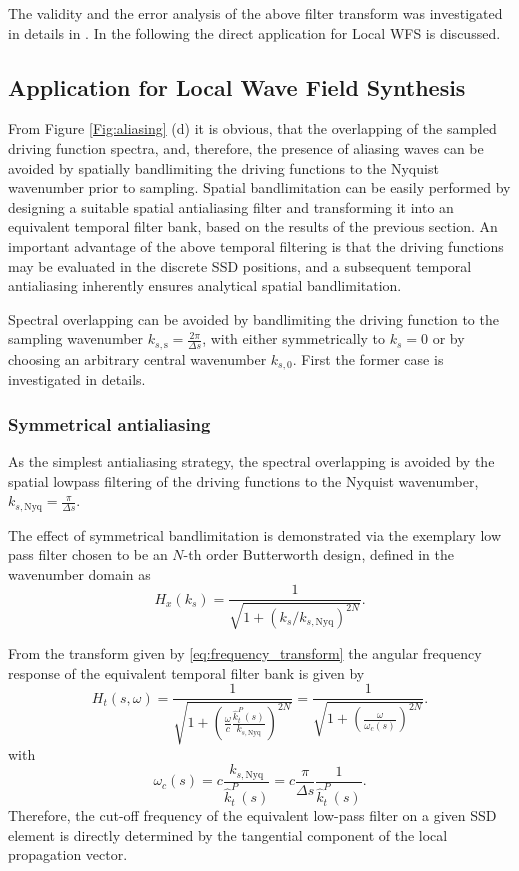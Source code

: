 \documentclass[conference]{IEEEtran}
\begin{document}
The validity and the error analysis of the above filter transform was investigated in details in \cite{Firtha DAGA2023}.
In the following the direct application for Local WFS is discussed.

\subsection{Application for Local Wave Field Synthesis}

From Figure \ref{Fig:aliasing} (d) it is obvious, that the overlapping of the sampled driving function spectra, and, therefore, the presence of aliasing waves can be avoided by spatially bandlimiting the driving functions to the Nyquist wavenumber prior to sampling.
Spatial bandlimitation can be easily performed by designing a suitable spatial antialiasing filter and transforming it into an equivalent temporal filter bank, based on the results of the previous section.
An important advantage of the above temporal filtering is that the driving functions may be evaluated in the discrete SSD positions, and a subsequent temporal antialiasing inherently ensures analytical spatial bandlimitation.

Spectral overlapping can be avoided by bandlimiting the driving function to the sampling wavenumber $k_{s,\mathrm{s}} = \frac{2\pi}{\Delta s}$, with either symmetrically to $k_s = 0$ or by choosing an arbitrary central wavenumber $k_{s,0}$.
First the former case is investigated in details.

\subsubsection{Symmetrical antialiasing}
As the simplest antialiasing strategy, the spectral overlapping is avoided by the spatial lowpass filtering of the driving functions to the Nyquist wavenumber, $k_{s,\mathrm{Nyq}} = \frac{\pi}{\Delta s}$.

The effect of symmetrical bandlimitation is demonstrated via the exemplary low pass filter chosen to be an $N$-th order Butterworth design, defined in the wavenumber domain as
\begin{equation}
    H_x(k_s) = \frac{ 1 }{ \sqrt{ 1 + \left( k_s / k_{s,\mathrm{Nyq}} \right)^{2N} } }.
\end{equation}

From the transform given by \eqref{eq:frequency_transform} the angular frequency response of the equivalent temporal filter bank is given by
\begin{equation}
    H_t(s,\omega) = \frac{ 1 }{ \sqrt{ 1 + \left( \frac{\omega}{c}\frac{\hat{k}_t^P(s)}{k_{s,\mathrm{Nyq}}}  \right)^{2N} } } =  \frac{ 1 }{ \sqrt{ 1 + \left( \frac{\omega}{\omega_c(s)}  \right)^{2N} } } .
\end{equation}
with
\begin{equation}
    \omega_c(s) = c \frac{k_{s,\mathrm{Nyq}}}{\hat{k}_t^P(s)} = c\frac{ \pi}{\Delta s} \frac{1}{\hat{k}_t^P(s)}.
    \label{eq:cutoff_fr}
\end{equation}
Therefore, the cut-off frequency of the equivalent low-pass filter on a given SSD element is directly determined by the tangential component of the local propagation vector.
\end{document}
